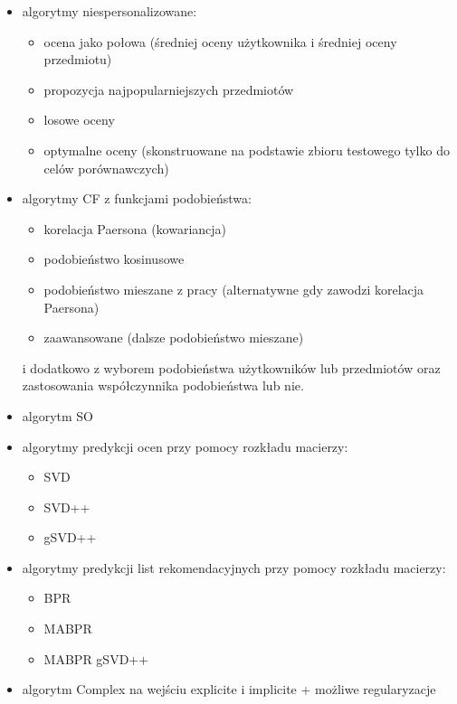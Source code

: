 \documentclass{pracamgr}
\begin{document}
   \begin{itemize}\itemsep1pt \parskip0pt 
    \item algorytmy niespersonalizowane:
     \begin{itemize}\itemsep1pt \parskip0pt 
      \item ocena jako połowa (średniej oceny użytkownika i średniej oceny przedmiotu)
      \item propozycja najpopularniejszych przedmiotów
      \item losowe oceny
      \item optymalne oceny (skonstruowane na podstawie zbioru testowego tylko do celów porównawczych)
     \end{itemize}
    \item algorytmy CF z funkcjami podobieństwa:
     \begin{itemize}\itemsep1pt \parskip0pt 
      \item korelacja Paersona (kowariancja)
      \item podobieństwo kosinusowe
      \item podobieństwo mieszane z pracy \cite{221} (alternatywne gdy zawodzi korelacja Paersona)
      \item zaawansowane (dalsze podobieństwo mieszane)
     \end{itemize}
     i dodatkowo z wyborem podobieństwa użytkowników lub przedmiotów oraz zastosowania współczynnika podobieństwa lub nie.
    \item algorytm SO
    \item algorytmy predykcji ocen przy pomocy rozkładu macierzy:
     \begin{itemize}\itemsep1pt \parskip0pt 
      \item SVD
      \item SVD++
      \item gSVD++
     \end{itemize}
    \item algorytmy predykcji list rekomendacyjnych przy pomocy rozkładu macierzy:
     \begin{itemize}\itemsep1pt \parskip0pt 
      \item BPR
      \item MABPR
      \item MABPR gSVD++
     \end{itemize}   
    \item algorytm Complex na wejściu explicite i implicite + możliwe regularyzacje
   \end{itemize}  
\end{document}

